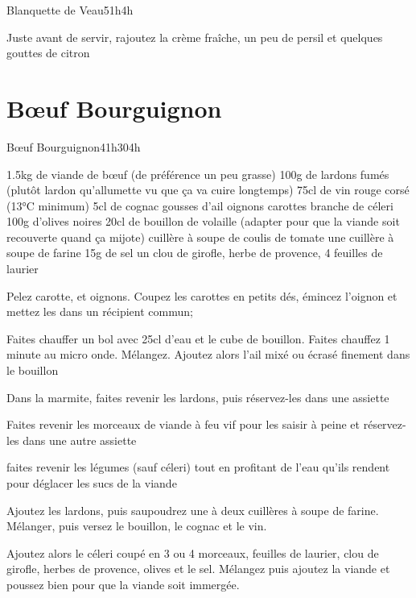 {\begin{recette}{Blanquette de Veau}{5}{1h}{4h}
\begin{preparation}
\etape Juste avant de servir, rajoutez la crème fraîche, un peu de persil et quelques gouttes de citron
\end{preparation}
\end{recette}

\section{Bœuf Bourguignon}
\begin{recette}{Bœuf Bourguignon}{4}{1h30}{4h}
\begin{ingredients}
\ingredient 1.5kg de viande de bœuf (de préférence un peu grasse)
\ingredient 100g de lardons fumés (plutôt lardon qu'allumette vu que ça va cuire longtemps)
\ingredient 75cl de vin rouge corsé (13°C minimum)
\ingredient 5cl de cognac
 gousses d'ail
 oignons
 carottes
 branche de céleri
\ingredient 100g d'olives noires
\ingredient 20cl de bouillon de volaille (adapter pour que la viande soit recouverte quand ça mijote)
 cuillère à soupe de coulis de tomate
\ingredient une cuillère à soupe de farine
\ingredient 15g de sel
\ingredient un clou de girofle, herbe de provence, 4 feuilles de laurier
\end{ingredients}

\begin{preparation}
\etape Pelez carotte, et oignons. Coupez les carottes en petits dés, émincez l'oignon et mettez les dans un récipient commun;

\etape Faites chauffer un bol avec 25cl d'eau et le cube de bouillon. 
Faites chauffez 1 minute au micro onde. Mélangez. 
\etape Ajoutez alors l'ail mixé ou écrasé finement dans le bouillon

\etape Dans la marmite, faites revenir les lardons, puis réservez-les dans une assiette

\etape Faites revenir les morceaux de viande à feu vif pour les saisir à peine et réservez-les dans une autre assiette

\etape faites revenir les légumes (sauf céleri) tout en profitant de l'eau qu'ils rendent pour déglacer les sucs de la viande

\etape Ajoutez les lardons, puis saupoudrez une à deux cuillères à soupe de farine. Mélanger, puis versez le bouillon, le cognac et le vin.

\etape Ajoutez alors le céleri coupé en 3 ou 4 morceaux, feuilles de laurier, clou de girofle, herbes de provence, olives et le sel. Mélangez puis ajoutez la viande et poussez bien pour que la viande soit immergée.


\end{preparation}
\end{recette}}
